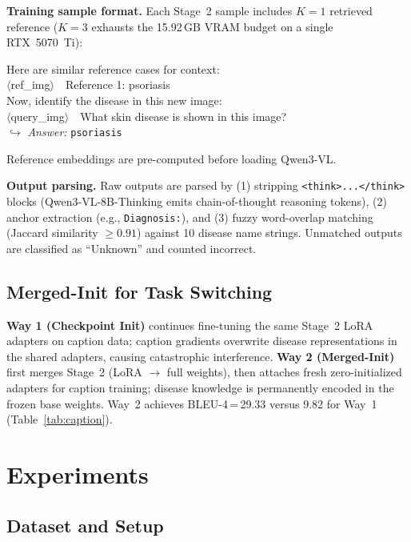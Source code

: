 \documentclass[conference,a4paper]{IEEEtran}
\begin{document}
\textbf{Training sample format.}
Each Stage~2 sample includes $K{=}1$ retrieved reference ($K{=}3$
exhausts the 15.92\,GB VRAM budget on a single RTX~5070~Ti):
\begin{center}
{\footnotesize\ttfamily\raggedright\setlength{\baselineskip}{1.3\baselineskip}
Here are similar reference cases for context:\\
$\langle$ref\_img$\rangle$\ \ Reference 1: psoriasis\\
Now, identify the disease in this new image:\\
$\langle$query\_img$\rangle$\ \ What skin disease is shown in this image?\\
\textrm{$\hookrightarrow$ \textit{Answer:} \texttt{psoriasis}}
}
\end{center}
Reference embeddings are pre-computed before loading Qwen3-VL.

\textbf{Output parsing.}
Raw outputs are parsed by (1) stripping \texttt{<think>...</think>}
blocks (Qwen3-VL-8B-Thinking emits chain-of-thought reasoning tokens),
(2) anchor extraction (e.g., \texttt{Diagnosis:}), and
(3) fuzzy word-overlap matching (Jaccard similarity ${\geq}0.91$) against 10 disease
name strings.  Unmatched outputs are classified as ``Unknown'' and
counted incorrect.

\subsection{Merged-Init for Task Switching}
\label{sec:mergedinit}

\textbf{Way 1 (Checkpoint Init)} continues fine-tuning the same Stage~2
LoRA adapters on caption data; caption gradients overwrite disease
representations in the shared adapters, causing catastrophic
interference.  \textbf{Way 2 (Merged-Init)} first merges Stage~2
(LoRA $\rightarrow$ full weights), then attaches fresh zero-initialized
adapters for caption training; disease knowledge is permanently encoded
in the frozen base weights.  Way~2 achieves BLEU-4\,=\,29.33 versus
9.82 for Way~1 (Table~\ref{tab:caption}).


\section{Experiments}

\subsection{Dataset and Setup}
\end{document}
